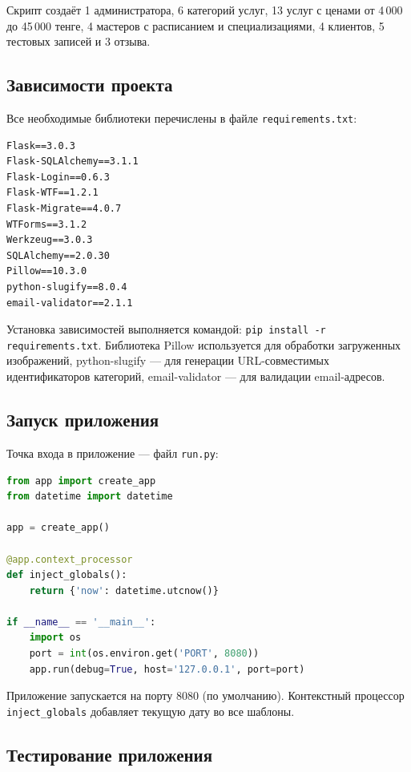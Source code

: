 \documentclass[14pt,a4paper,oneside]{extarticle}
\begin{document}
Скрипт создаёт 1 администратора, 6 категорий услуг, 13 услуг с ценами от 4\,000 до 45\,000 тенге, 4 мастеров с расписанием и специализациями, 4 клиентов, 5 тестовых записей и 3 отзыва.

\subsection{Зависимости проекта}

Все необходимые библиотеки перечислены в файле \texttt{requirements.txt}:

\begin{lstlisting}[language={}, caption={Зависимости проекта (requirements.txt)}, label={lst:requirements}]
Flask==3.0.3
Flask-SQLAlchemy==3.1.1
Flask-Login==0.6.3
Flask-WTF==1.2.1
Flask-Migrate==4.0.7
WTForms==3.1.2
Werkzeug==3.0.3
SQLAlchemy==2.0.30
Pillow==10.3.0
python-slugify==8.0.4
email-validator==2.1.1
\end{lstlisting}

Установка зависимостей выполняется командой: \texttt{pip install -r requirements.txt}. Библиотека Pillow используется для обработки загруженных изображений, python-slugify --- для генерации URL-совместимых идентификаторов категорий, email-validator --- для валидации email-адресов.

\subsection{Запуск приложения}

Точка входа в приложение --- файл \texttt{run.py}:

\begin{lstlisting}[language=Python, caption={Точка входа в приложение (run.py)}, label={lst:runpy}]
from app import create_app
from datetime import datetime

app = create_app()

@app.context_processor
def inject_globals():
    return {'now': datetime.utcnow()}

if __name__ == '__main__':
    import os
    port = int(os.environ.get('PORT', 8080))
    app.run(debug=True, host='127.0.0.1', port=port)
\end{lstlisting}

Приложение запускается на порту 8080 (по умолчанию). Контекстный процессор \texttt{inject\_globals} добавляет текущую дату во все шаблоны.

\subsection{Тестирование приложения}
\end{document}
